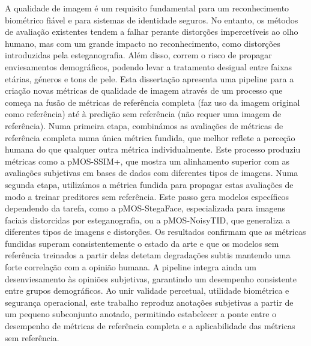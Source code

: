 A qualidade de imagem é um requisito fundamental para um reconhecimento biométrico fiável e para sistemas de identidade seguros. No entanto, os métodos de avaliação existentes tendem a falhar perante distorções impercetíveis ao olho humano, mas com um grande impacto no reconhecimento, como distorções introduzidas pela esteganografia. Além disso, correm o risco de propagar enviesamentos demográficos, podendo levar a tratamento desigual entre faixas etárias, géneros e tons de pele. Esta dissertação apresenta uma pipeline para a criação novas métricas de qualidade de imagem através de um processo que começa na fusão de métricas de referência completa (faz uso da imagem original como referência) até à predição sem referência (não requer uma imagem de referência). Numa primeira etapa, combinámos as avaliações de métricas de referência completa numa única métrica fundida, que melhor reflete a perceção humana do que qualquer outra métrica individualmente. Este processo produziu métricas como a pMOS-SSIM+, que mostra um alinhamento superior com as avaliações subjetivas em bases de dados com diferentes tipos de imagens. Numa segunda etapa, utilizámos a métrica fundida para propagar estas avaliações de modo a treinar preditores sem referência. Este passo gera modelos específicos dependendo da tarefa, como a pMOS-StegaFace, especializada para imagens faciais distorcidas por esteganografia, ou a pMOS-NoisyTID, que generaliza a diferentes tipos de imagens e distorções. Os resultados confirmam que as métricas fundidas superam consistentemente o estado da arte e que os modelos sem referência treinados a partir delas detetam degradações subtis mantendo uma forte correlação com a opinião humana. A pipeline integra ainda um desenviesamento às opiniões subjetivas, garantindo um desempenho consistente entre grupos demográficos. Ao unir validade percetual, utilidade biométrica e segurança operacional, este trabalho reproduz anotações subjetivas a partir de um pequeno subconjunto anotado, permitindo estabelecer a ponte entre o desempenho de métricas de referência completa e a aplicabilidade das métricas sem referência.